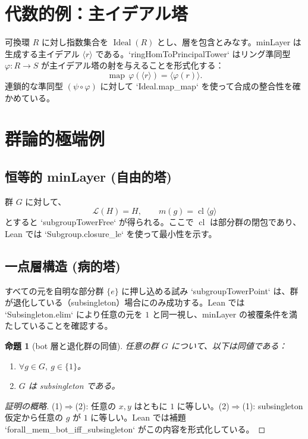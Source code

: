 \documentclass[a4paper]{ltjsarticle}
\theoremstyle{definition}
\theoremstyle{plain}
\newtheorem{proposition}{命題}
\theoremstyle{remark}
\begin{document}
\section{代数的例：主イデアル塔}
可換環 $R$ に対し指数集合を $\operatorname{Ideal}(R)$ とし、層を包含とみなす。minLayer は生成する主イデアル $\langle r \rangle$ である。`ringHomToPrincipalTower` はリング準同型 $\varphi: R \to S$ が主イデアル塔の射を与えることを形式化する：
\[
\operatorname{map}\,\varphi (\langle r \rangle)=\langle \varphi(r) \rangle.
\]
連鎖的な準同型 $(\psi \circ \varphi)$ に対して `Ideal.map_map` を使って合成の整合性を確かめている。

\section{群論的極端例}
\subsection{恒等的 minLayer (自由的塔)}
群 $G$ に対して、
\[
\mathcal{L}(H)=H,\qquad m(g)=\operatorname{cl}\langle g \rangle
\]
とすると `subgroupTowerFree` が得られる。ここで $\operatorname{cl}$ は部分群の閉包であり、Lean では `Subgroup.closure_le` を使って最小性を示す。

\subsection{一点層構造 (病的塔)}
すべての元を自明な部分群 $\{e\}$ に押し込める試み `subgroupTowerPoint` は、群が退化している（subsingleton）場合にのみ成功する。Lean では `Subsingleton.elim` により任意の元を $1$ と同一視し、minLayer の被覆条件を満たしていることを確認する。

\begin{proposition}[bot 層と退化群の同値]
任意の群 $G$ について、以下は同値である：
\begin{enumerate}
  \item $\forall g \in G,\ g \in \{1\}$。
  \item $G$ は subsingleton である。
\end{enumerate}
\end{proposition}
\begin{proof}[証明の概略]
(1)$\Rightarrow$(2): 任意の $x,y$ はともに $1$ に等しい。\quad (2)$\Rightarrow$(1): subsingleton 仮定から任意の $g$ が $1$ に等しい。Lean では補題 `forall_mem_bot_iff_subsingleton` がこの内容を形式化している。
\end{proof}
\end{document}
